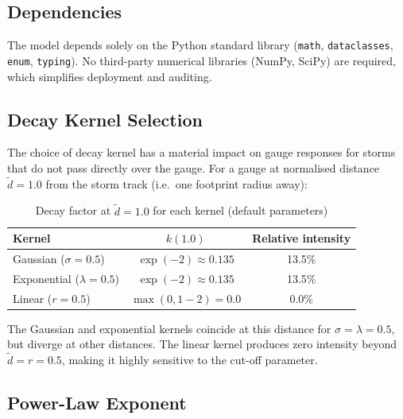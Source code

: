 \documentclass[11pt,a4paper]{article}
\begin{document}
\subsection{Dependencies}

The model depends solely on the Python standard library (\texttt{math},
\texttt{dataclasses}, \texttt{enum}, \texttt{typing}). No third-party numerical
libraries (NumPy, SciPy) are required, which simplifies deployment and auditing.

\mkmsensitivity



\subsection{Decay Kernel Selection}

The choice of decay kernel has a material impact on gauge responses for storms
that do not pass directly over the gauge. For a gauge at normalised distance
$\tilde{d} = 1.0$ from the storm track (i.e.\ one footprint radius away):

\begin{table}[H]
    \centering
    \caption{Decay factor at $\tilde{d} = 1.0$ for each kernel (default parameters)}
    \label{tab:decay_comparison}
    \begin{tabular}{lcc}
        \toprule
        \textbf{Kernel} & \textbf{$k(1.0)$} & \textbf{Relative intensity} \\
        \midrule
        Gaussian ($\sigma = 0.5$) & $\exp(-2) \approx 0.135$ & 13.5\% \\
        Exponential ($\lambda = 0.5$) & $\exp(-2) \approx 0.135$ & 13.5\% \\
        Linear ($r = 0.5$) & $\max(0, 1-2) = 0.0$ & 0.0\% \\
        \bottomrule
    \end{tabular}
\end{table}

\noindent The Gaussian and exponential kernels coincide at this distance for
$\sigma = \lambda = 0.5$, but diverge at other distances. The linear kernel
produces zero intensity beyond $\tilde{d} = r = 0.5$, making it highly sensitive
to the cut-off parameter.

\subsection{Power-Law Exponent}
\end{document}
